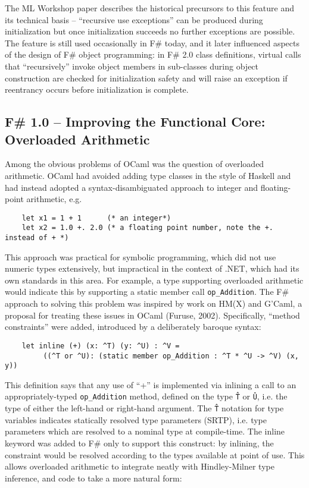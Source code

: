 \documentclass[acmsmall,review]{acmart}\settopmatter{printfolios=true,printccs=false,printacmref=false}
\begin{document}
The ML Workshop paper describes the historical precursors to this feature and its technical basis – “recursive use exceptions” can be produced during initialization but once initialization succeeds no further exceptions are possible. The feature is still used occasionally in F\# today, and it later influenced aspects of the design of F\# object programming: in F\# 2.0 class definitions, virtual calls that “recursively” invoke object members in sub-classes during object construction are checked for initialization safety and will raise an exception if reentrancy occurs before initialization is complete. 


\subsection*{F\# 1.0 – Improving the Functional Core: Overloaded Arithmetic }

Among the obvious problems of OCaml was the question of overloaded arithmetic.  OCaml had avoided adding type classes in the style of Haskell and had instead adopted a syntax-disambiguated approach to integer and floating-point arithmetic, e.g.

\begin{verbatim}
    let x1 = 1 + 1      (* an integer*)
    let x2 = 1.0 +. 2.0 (* a floating point number, note the +. instead of + *)
\end{verbatim}

This approach was practical for symbolic programming, which did not use numeric types extensively, but impractical in the context of .NET, which had its own standards in this area. For example, a type supporting overloaded arithmetic would indicate this by supporting a static member call \texttt{op\_Addition}. The F\# approach to solving this problem was inspired by work on HM(X) and G'Caml, a proposal for treating these issues in OCaml (Furuse, 2002).  Specifically, “method constraints” were added, introduced by a deliberately baroque syntax:

\begin{verbatim}
    let inline (+) (x: ^T) (y: ^U) : ^V = 
         ((^T or ^U): (static member op_Addition : ^T * ^U -> ^V) (x, y))
\end{verbatim}

This definition says that any use of “+” is implemented via inlining a call to an appropriately-typed \texttt{op\_Addition} method, defined on the type \texttt{\^T} or \texttt{\^U}, i.e. the type of either the left-hand or right-hand argument.  The \texttt{\^T} notation for type variables indicates statically resolved type parameters (SRTP), i.e. type parameters which are resolved to a nominal type at compile-time.  The inline keyword was added to F\# only to support this construct: by inlining, the constraint would be resolved according to the types available at point of use. This allows overloaded arithmetic to integrate neatly with Hindley-Milner type inference, and code to take a more natural form:
\end{document}
